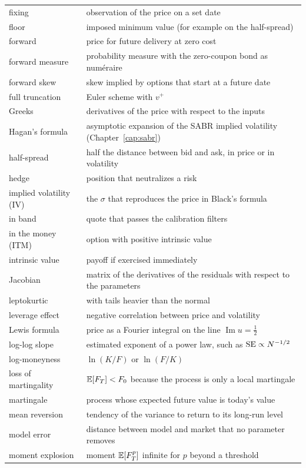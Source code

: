 \begin{small}
\begin{longtable}{@{}>{\raggedright\arraybackslash}p{}%
  >{\raggedright\arraybackslash}p{}@{}}
fixing & observation of the price on a set date\\
floor & imposed minimum value (for example on the half-spread)\\
forward & price for future delivery at zero cost\\
forward measure & probability measure with the zero-coupon bond as numéraire\\
forward skew & skew implied by options that start at a future date\\
full truncation & Euler scheme with $v^+$\\
Greeks & derivatives of the price with respect to the inputs\\
Hagan's formula & asymptotic expansion of the SABR implied volatility (Chapter~\ref{cap:sabr})\\
half-spread & half the distance between bid and ask, in price or in volatility\\
hedge & position that neutralizes a risk\\
implied volatility (IV) & the $\sigma$ that reproduces the price in Black's formula\\
in band & quote that passes the calibration filters\\
in the money (ITM) & option with positive intrinsic value\\
intrinsic value & payoff if exercised immediately\\
Jacobian & matrix of the derivatives of the residuals with respect to the parameters\\
leptokurtic & with tails heavier than the normal\\
leverage effect & negative correlation between price and volatility\\
Lewis formula & price as a Fourier integral on the line $\operatorname{Im}u=\tfrac12$\\
log-log slope & estimated exponent of a power law, such as $\mathrm{SE}\propto N^{-1/2}$\\
log-moneyness & $\ln(K/F)$ or $\ln(F/K)$\\
loss of martingality & $\mathbb{E}[F_T]<F_0$ because the process is only a local martingale\\
martingale & process whose expected future value is today's value\\
mean reversion & tendency of the variance to return to its long-run level\\
model error & distance between model and market that no parameter removes\\
moment explosion & moment $\mathbb{E}[F_T^p]$ infinite for $p$ beyond a threshold\\

\end{longtable}
\end{small}
